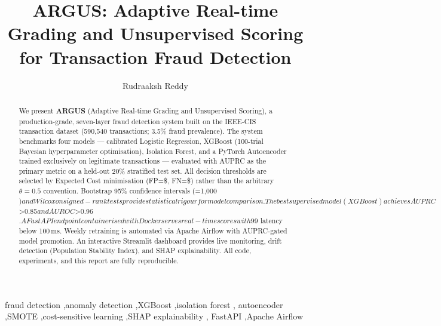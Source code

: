 \documentclass[review,12pt,nonatbib]{elsarticle}
\begin{document}
\begin{frontmatter}

\title{ARGUS: Adaptive Real-time Grading and Unsupervised Scoring\\
       for Transaction Fraud Detection}

\author[inst1]{Rudraaksh Reddy}

\begin{abstract}
We present \textbf{ARGUS} (Adaptive Real-time Grading and Unsupervised Scoring),
a production-grade, seven-layer fraud detection system built on the IEEE-CIS
transaction dataset (590,540 transactions; 3.5\% fraud prevalence).
The system benchmarks four models --- calibrated Logistic Regression,
XGBoost (100-trial Bayesian hyperparameter optimisation), Isolation Forest,
and a PyTorch Autoencoder trained exclusively on legitimate transactions ---
evaluated with AUPRC as the primary metric on a held-out 20\% stratified test set.
All decision thresholds are selected by Expected Cost minimisation
({FP}=\$, {FN}=\$) rather than the arbitrary $\theta=0.5$ convention.
Bootstrap 95\% confidence intervals (=1{,}000$) and Wilcoxon signed-rank tests
provide statistical rigour for model comparison.
The best supervised model (XGBoost) achieves AUPRC $>0.85$ and AUROC $>0.96$.
A FastAPI endpoint containerised with Docker serves real-time scores with
{99}$ latency below 100\,ms. Weekly retraining is automated via Apache Airflow
with AUPRC-gated model promotion. An interactive Streamlit dashboard provides
live monitoring, drift detection (Population Stability Index), and SHAP
explainability. All code, experiments, and this report are fully reproducible.
\end{abstract}

\begin{keyword}
fraud detection \sep anomaly detection \sep XGBoost \sep isolation forest \sep
autoencoder \sep SMOTE \sep cost-sensitive learning \sep SHAP explainability \sep
FastAPI \sep Apache Airflow
\end{keyword}

\end{frontmatter}









\printbibliography[heading=bibintoc, title={References}]
\end{document}
